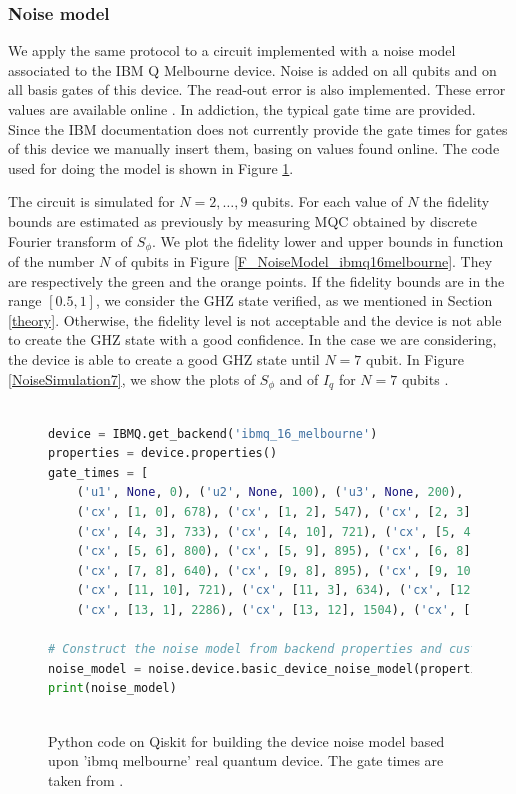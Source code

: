 \subsubsection{Noise model}

We apply the same protocol to a circuit implemented with a noise model associated to the IBM Q Melbourne device. Noise is added on all qubits and on all basis gates of this device. The read-out error is also implemented. These error values are available online \cite{TutorialQiskit}. In addiction, the typical gate time are provided. 
Since the IBM documentation does not currently provide the gate times for gates of this device we manually insert them, basing on values found online. 
The code used for doing the model is shown in Figure \ref{NoiseModel_code}. 

The circuit is simulated for $N=2,\dots,9$ qubits. For each value of $N$ the fidelity bounds are estimated as previously by measuring MQC obtained by discrete Fourier transform of $S_\phi$. 
We plot the fidelity lower and upper bounds in function of the number $N$ of qubits in Figure \ref{F_NoiseModel_ibmq16melbourne}. They are respectively the green and the orange points.
If the fidelity bounds are in the range $[0.5,1]$, we consider the GHZ state verified, as we mentioned in Section \ref{theory}. Otherwise, the fidelity level is not acceptable and the device is not able to create the GHZ state with a good confidence. In the case we are considering, the device is able to create a good GHZ state until $N=7$ qubit.
In Figure \ref{NoiseSimulation7}, we show the plots of $S_\phi$ and of $I_q$ for  $N=7$ qubits .



\begin{figure}[h!]

\begin{lstlisting}[language=Python]%[language=Python, caption=Python example]

device = IBMQ.get_backend('ibmq_16_melbourne')
properties = device.properties()
gate_times = [
    ('u1', None, 0), ('u2', None, 100), ('u3', None, 200),
    ('cx', [1, 0], 678), ('cx', [1, 2], 547), ('cx', [2, 3], 721),
    ('cx', [4, 3], 733), ('cx', [4, 10], 721), ('cx', [5, 4], 800),
    ('cx', [5, 6], 800), ('cx', [5, 9], 895), ('cx', [6, 8], 895),
    ('cx', [7, 8], 640), ('cx', [9, 8], 895), ('cx', [9, 10], 800),
    ('cx', [11, 10], 721), ('cx', [11, 3], 634), ('cx', [12, 2], 773),
    ('cx', [13, 1], 2286), ('cx', [13, 12], 1504), ('cx', [], 800)]

# Construct the noise model from backend properties and custom gate times
noise_model = noise.device.basic_device_noise_model(properties, gate_times=gate_times)
print(noise_model)
 
\end{lstlisting}

\caption{\label{NoiseModel_code} Python code on Qiskit for building the device noise model based upon 'ibmq melbourne' real quantum device. The gate times are taken from \cite{TutorialQiskit}.}
\end{figure}

